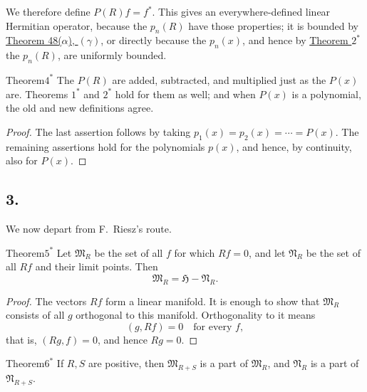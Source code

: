 ﻿\documentclass[paper=b5,fontsize=13pt,bookmarkpackage=false,twoside]{scrartcl}
\begin{document}
We therefore define \(P(R)f=f^*\).  This gives an everywhere-defined
linear Hermitian operator, because the \(p_n(R)\) have those
properties; it is bounded by \hyperref[thm:48]{Theorem 48(\(\alpha\)),
\((\gamma)\)}, or directly because the \(p_n(x)\), and hence by
\hyperref[thm:appII-2]{Theorem \(2^*\)} the \(p_n(R)\), are uniformly
bounded.

\begin{namedstatement}{Theorem}{\(4^*\)}
\label{thm:appII-4}
The \(P(R)\) are added, subtracted, and multiplied just as the
\(P(x)\) are.  Theorems \(1^*\) and \(2^*\) hold for them as well; and
when \(P(x)\) is a polynomial, the old and new definitions agree.
\end{namedstatement}

\begin{proof}
The last assertion follows by taking
\(p_1(x)=p_2(x)=\cdots=P(x)\).  The remaining assertions hold for the
polynomials \(p(x)\), and hence, by continuity, also for \(P(x)\).
\end{proof}

\subsection*{3.}
\label{appII:3}

We now depart from F.~Riesz's route.

\begin{namedstatement}{Theorem}{\(5^*\)}
\label{thm:appII-5}
Let \(\mathfrak M_R\) be the set of all \(f\) for which \(Rf=0\), and
let \(\mathfrak N_R\) be the set of all \(Rf\) and their limit points.
Then
\[
  \mathfrak M_R=\mathfrak H-\mathfrak N_R.
\]
\end{namedstatement}

\begin{proof}
The vectors \(Rf\) form a linear manifold.  It is enough to show that
\(\mathfrak M_R\) consists of all \(g\) orthogonal to this manifold.
Orthogonality to it means
\[
  (g,Rf)=0\quad\text{for every }f,
\]
that is, \((Rg,f)=0\), and hence \(Rg=0\).
\end{proof}

\begin{namedstatement}{Theorem}{\(6^*\)}
\label{thm:appII-6}
If \(R,S\) are positive, then \(\mathfrak M_{R+S}\) is a part of
\(\mathfrak M_R\), and \(\mathfrak N_R\) is a part of
\(\mathfrak N_{R+S}\).
\end{namedstatement}
\end{document}
